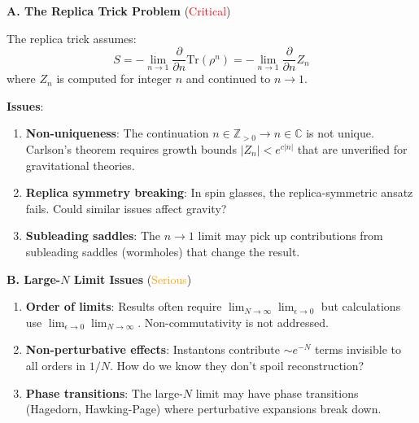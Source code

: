 \documentclass[12pt,a4paper]{article}
\begin{document}
\begin{tcolorbox}[colback=red!5!white, colframe=red!75!black, title=\textbf{RED TEAM Round 2: Proof-Specific Critiques}]

\textbf{A. The Replica Trick Problem} (\textcolor{red}{Critical})

The replica trick assumes:
\begin{equation}
S = -\lim_{n \to 1} \frac{\partial}{\partial n} \text{Tr}(\rho^n) = -\lim_{n \to 1} \frac{\partial}{\partial n} Z_n
\end{equation}
where $Z_n$ is computed for integer $n$ and continued to $n \to 1$.

\textbf{Issues}:
\begin{enumerate}[label=\textbf{R2.\arabic*.}]
    \item \textbf{Non-uniqueness}: The continuation $n \in \mathbb{Z}_{>0} \to n \in \mathbb{C}$ is not unique. Carlson's theorem requires growth bounds $|Z_n| < e^{c|n|}$ that are unverified for gravitational theories.
    
    \item \textbf{Replica symmetry breaking}: In spin glasses, the replica-symmetric ansatz fails. Could similar issues affect gravity?
    
    \item \textbf{Subleading saddles}: The $n \to 1$ limit may pick up contributions from subleading saddles (wormholes) that change the result.
\end{enumerate}

\textbf{B. Large-$N$ Limit Issues} (\textcolor{orange}{Serious})

\begin{enumerate}[resume, label=\textbf{R2.\arabic*.}]
    \item \textbf{Order of limits}: Results often require $\lim_{N \to \infty} \lim_{\epsilon \to 0}$ but calculations use $\lim_{\epsilon \to 0} \lim_{N \to \infty}$. Non-commutativity is not addressed.
    
    \item \textbf{Non-perturbative effects}: Instantons contribute $\sim e^{-N}$ terms invisible to all orders in $1/N$. How do we know they don't spoil reconstruction?
    
    \item \textbf{Phase transitions}: The large-$N$ limit may have phase transitions (Hagedorn, Hawking-Page) where perturbative expansions break down.
\end{enumerate}


\end{tcolorbox}
\end{document}

